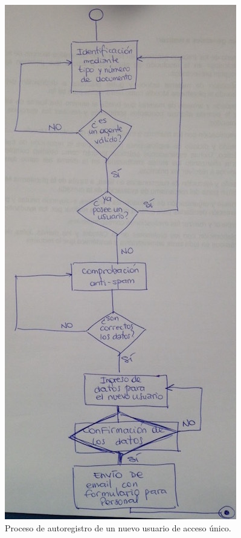 \begin{figure}[H]
  \centering
  \includegraphics[width=\textwidth,height=0.5\textheight,keepaspectratio]{src/images/04-capitulo-4/diagrama-flujo-registro.jpg}
  \caption{Proceso de autoregistro de un nuevo usuario de acceso único.}
  \label{fig:diagrama-flujo-registro}
\end{figure}


